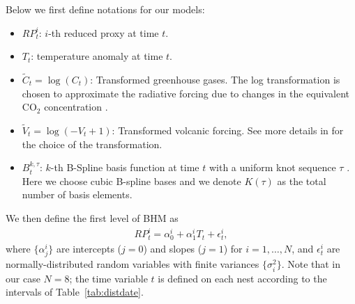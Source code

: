 \documentclass[12pt]{amsart}
\theoremstyle{plain}
\theoremstyle{definition}
\theoremstyle{remark}
\begin{document}
Below we first define notations for our models:
\begin{itemize}
\item $RP_t^i$: $i$-th reduced proxy at time $t$.
  
\item $T_t$: temperature anomaly at time $t$.
  
\item $\tilde C_t = \log (C_t)$: Transformed greenhouse gases. The log
  transformation is chosen to approximate the radiative forcing due to changes
  in the equivalent CO$_2$ concentration \citep{Barboza2014}.
  
\item $\tilde V_t = \log (-V_t+1)$: Transformed volcanic forcing. See more details in \cite{Barboza2014} for the choice of the transformation.
  
\item $B_t^{k,\tau}$: $k$-th B-Spline basis function at time $t$ with a uniform knot
  sequence $\tau$ \citep{DeBoor2001,Ramsay2005}. Here we choose
  cubic B-spline bases and we denote $K(\tau)$ as the total number of basis elements.  
\end{itemize}
We then define the first level of BHM as
\begin{align*}
RP_t^i=\alpha_0^i+\alpha_1^iT_t+\epsilon^i_t,  
\end{align*}
where $\{\alpha^i_j\}$ are intercepts ($j=0$) and slopes ($j=1$) for $i=1,\ldots,N$,  and $\epsilon^i_t$ are normally-distributed random variables with finite variances
$\{\sigma^2_i\}$. Note that in our case $N=8$; the time variable $t$ is defined on each nest according to the
intervals of Table~\ref{tab:distdate}. 
\end{document}
